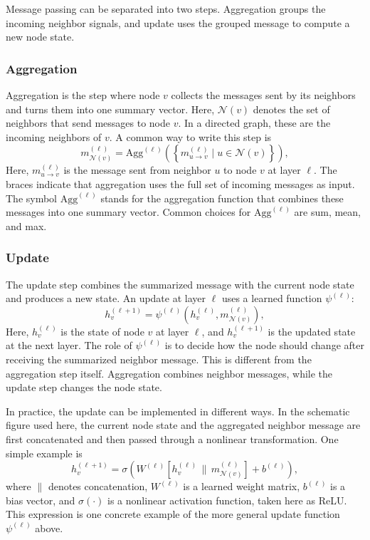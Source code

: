 \noindent Message passing can be separated into two steps. Aggregation groups the incoming neighbor signals, and update uses the grouped message to compute a new node state.

\subsubsection{Aggregation}
Aggregation is the step where node $v$ collects the messages sent by its neighbors and turns them into one summary vector. Here, $\mathcal{N}(v)$ denotes the set of neighbors that send messages to node $v$. In a directed graph, these are the incoming neighbors of $v$. A common way to write this step is
\begin{equation}
m_{\mathcal{N}(v)}^{(\ell)} = \mathrm{Agg}^{(\ell)}\!\left(\left\{m_{u \rightarrow v}^{(\ell)} \mid u \in \mathcal{N}(v)\right\}\right),
\end{equation}
Here, $m_{u \rightarrow v}^{(\ell)}$ is the message sent from neighbor $u$ to node $v$ at layer $\ell$. The braces indicate that aggregation uses the full set of incoming messages as input. The symbol $\mathrm{Agg}^{(\ell)}$ stands for the aggregation function that combines these messages into one summary vector. Common choices for $\mathrm{Agg}^{(\ell)}$ are sum, mean, and max.


\subsubsection{Update}
The update step combines the summarized message with the current node state and produces a new state. An update at layer $\ell$ uses a learned function $\psi^{(\ell)}$:
\begin{equation}
h_{v}^{(\ell+1)} = \psi^{(\ell)}\!\left(h_{v}^{(\ell)}, m_{\mathcal{N}(v)}^{(\ell)}\right),
\end{equation}
Here, $h_{v}^{(\ell)}$ is the state of node $v$ at layer $\ell$, and $h_{v}^{(\ell+1)}$ is the updated state at the next layer. The role of $\psi^{(\ell)}$ is to decide how the node should change after receiving the summarized neighbor message. This is different from the aggregation step itself. Aggregation combines neighbor messages, while the update step changes the node state.

\noindent In practice, the update can be implemented in different ways. In the schematic figure used here, the current node state and the aggregated neighbor message are first concatenated and then passed through a nonlinear transformation. One simple example is
\begin{equation}
h_{v}^{(\ell+1)}=\sigma\!\left(W^{(\ell)}\left[h_{v}^{(\ell)} \,\|\, m_{\mathcal{N}(v)}^{(\ell)}\right]+b^{(\ell)}\right),
\end{equation}
where $\|$ denotes concatenation, $W^{(\ell)}$ is a learned weight matrix, $b^{(\ell)}$ is a bias vector, and $\sigma(\cdot)$ is a nonlinear activation function, taken here as ReLU. This expression is one concrete example of the more general update function $\psi^{(\ell)}$ above.

